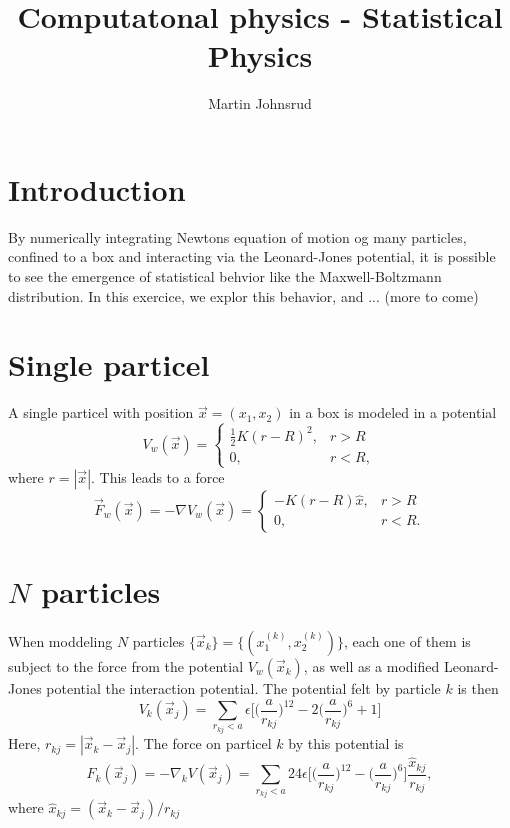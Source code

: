 \documentclass{article}
\title{Computatonal physics - Statistical Physics}
\author{Martin Johnsrud}
\begin{document}
    \maketitle
    
    \section*{Introduction}
    By numerically integrating Newtons equation of motion og many particles, confined to a box and interacting via the Leonard-Jones potential, it is possible to see the emergence of statistical behvior like the Maxwell-Boltzmann distribution. In this exercice, we explor this behavior, and ... (more to come)

    \section*{Single particel}
    A single particel with position $\vec x = (x_1, x_2)$ in a box is modeled in a potential 
    \begin{equation*}
        V_w(\vec x) = 
        \begin{cases}
            \frac{1}{2}K(r - R)^2, & r > R \\
            0, & r < R,
        \end{cases}
    \end{equation*}
    where $r = |\vec x|$. This leads to a force 
    \begin{equation*}
        \vec F_w(\vec x) = -\nabla V_w(\vec x) = 
        \begin{cases}
            -K(r - R)\hat x, & r>R \\
            0, & r<R.
        \end{cases}
    \end{equation*}

    \section*{$N$ particles}
    When moddeling $N$ particles $\{ \vec x_k\} = \{ (x_1^{(k)}, x_2^{(k)}) \}$, each one of them is subject to the force from the potential $V_w(\vec x_k)$, as well as a modified Leonard-Jones potential the interaction potential. The potential felt by particle $k$ is then
    \begin{equation*}
        V_k(\vec x_j) = 
        \sum_{r_{kj}<a}\epsilon \bigg[ \bigg( \frac{a}{r_{kj}}\bigg)^{12} - 2\bigg(\frac{a}{r_{kj}}\bigg)^{6} + 1 \bigg]
    \end{equation*}
    Here, $r_{kj} = |\vec x_k - \vec x_j|$. The force on particel $k$ by this potential is
    \begin{equation*}
        F_k (\vec x_j) = -\nabla_k V(\vec x_j) = \sum_{r_{kj}<a} 24 \epsilon \bigg[ \bigg( \frac{a}{r_{kj}}\bigg)^{12} - \bigg(\frac{a}{r_{kj}}\bigg)^{6}\bigg] \frac{\hat x_{kj}}{r_{kj}},
    \end{equation*}
    where $\hat x_{kj} = (\vec x_k - \vec x_j) / r_{kj}$
\end{document}
